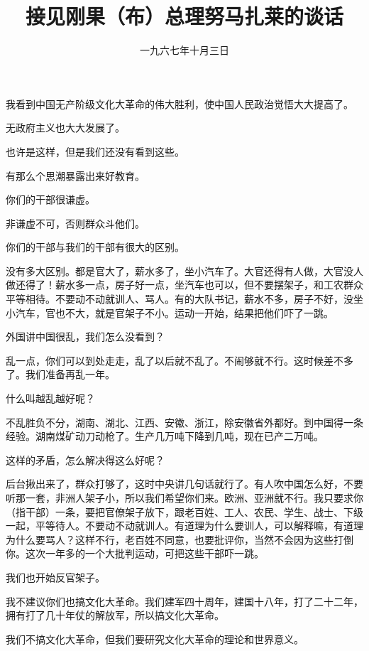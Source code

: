 
\title{接见刚果（布）总理努马扎莱的谈话}
\date{一九六七年十月三日}
\maketitle


我看到中国无产阶级文化大革命的伟大胜利，使中国人民政治觉悟大大提高了。

无政府主义也大大发展了。

也许是这样，但是我们还没有看到这些。

有那么个思潮暴露出来好教育。

你们的干部很谦虚。

非谦虚不可，否则群众斗他们。

你们的干部与我们的干部有很大的区别。

没有多大区别。都是官大了，薪水多了，坐小汽车了。大官还得有人做，大官没人做还得了！薪水多一点，房子好一点，坐汽车也可以，但不要摆架子，和工农群众平等相待。不要动不动就训人、骂人。有的大队书记，薪水不多，房子不好，没坐小汽车，官也不大，就是官架子不小。运动一开始，结果把他们吓了一跳。

外国讲中国很乱，我们怎么没看到？

乱一点，你们可以到处走走，乱了以后就不乱了。不闹够就不行。这时候差不多了。我们准备再乱一年。

什么叫越乱越好呢？

不乱胜负不分，湖南、湖北、江西、安徽、浙江，除安徽省外都好。到中国得一条经验。湖南煤矿动刀动枪了。生产几万吨下降到几吨，现在已产二万吨。

这样的矛盾，怎么解决得这么好呢？

后台揪出来了，群众打够了，这时中央讲几句话就行了。有人吹中国怎么好，不要听那一套，非洲人架子小，所以我们希望你们来。欧洲、亚洲就不行。我只要求你（指干部）一条，要把官僚架子放下，跟老百姓、工人、农民、学生、战士、下级一起，平等待人。不要动不动就训人。有道理为什么要训人，可以解释嘛，有道理为什么要骂人？这样不行，老百姓不同意，也要批评你，当然不会因为这些打倒你。这次一年多的一个大批判运动，可把这些干部吓一跳。

我们也开始反官架子。

我不建议你们也搞文化大革命。我们建军四十周年，建国十八年，打了二十二年，拥有打了几十年仗的解放军，所以搞文化大革命。

我们不搞文化大革命，但我们要研究文化大革命的理论和世界意义。

